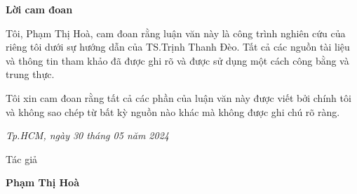 \vspace*{3cm}

\begin{center}
\LARGE{\textbf{Lời cam đoan}}
\end{center}

Tôi, Phạm Thị Hoà, cam đoan rằng luận văn này là công trình nghiên cứu của riêng tôi dưới sự hướng dẫn của TS.Trịnh Thanh Đèo. Tất cả các nguồn tài liệu và thông tin tham khảo đã được ghi rõ và được sử dụng một cách công bằng và trung thực.

Tôi xin cam đoan rằng tất cả các phần của luận văn này được viết bởi chính tôi và không sao chép từ bất kỳ nguồn nào khác mà không được ghi chú rõ ràng.


\begin{flushright}
{\it Tp.HCM, ngày 30 tháng 05 năm 2024}

Tác giả\hskip 2cm\quad

\vskip 2cm

{\bf Phạm Thị Hoà} \hskip 1cm \quad\ 
 \end{flushright}
\thispagestyle{empty}
